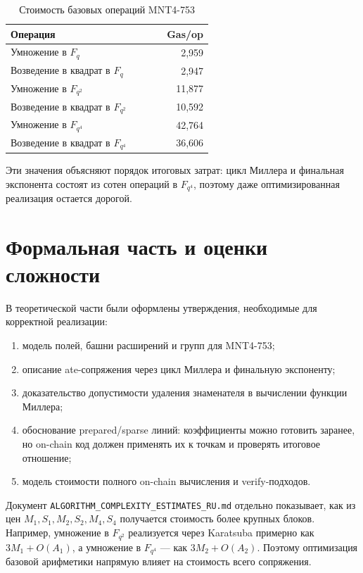 \documentclass[12pt,a4paper]{article}
\newcommand{\code}[1]{\texttt{#1}}
\begin{document}
\begin{table}[h!]
\centering
\caption{Стоимость базовых операций MNT4-753}
\begin{tabular}{p{0.62\linewidth}r}
\toprule
Операция & Gas/op \\
\midrule
Умножение в \(F_q\) & 2,959 \\
Возведение в квадрат в \(F_q\) & 2,947 \\
Умножение в \(F_{q^2}\) & 11,877 \\
Возведение в квадрат в \(F_{q^2}\) & 10,592 \\
Умножение в \(F_{q^4}\) & 42,764 \\
Возведение в квадрат в \(F_{q^4}\) & 36,606 \\
\bottomrule
\end{tabular}
\end{table}

Эти значения объясняют порядок итоговых затрат: цикл Миллера и финальная экспонента состоят из сотен операций в \(F_{q^4}\), поэтому даже оптимизированная реализация остается дорогой.

\section{Формальная часть и оценки сложности}

В теоретической части были оформлены утверждения, необходимые для корректной реализации:

\begin{enumerate}
    \item модель полей, башни расширений и групп для MNT4-753;
    \item описание ate-сопряжения через цикл Миллера и финальную экспоненту;
    \item доказательство допустимости удаления знаменателя в вычислении функции Миллера;
    \item обоснование prepared/sparse линий: коэффициенты можно готовить заранее, но on-chain код должен применять их к точкам и проверять итоговое отношение;
    \item модель стоимости полного on-chain вычисления и verify-подходов.
\end{enumerate}

Документ \code{ALGORITHM\_COMPLEXITY\_ESTIMATES\_RU.md} отдельно показывает, как из цен \(M_1,S_1,M_2,S_2,M_4,S_4\) получается стоимость более крупных блоков. Например, умножение в \(F_{q^2}\) реализуется через Karatsuba примерно как \(3M_1+O(A_1)\), а умножение в \(F_{q^4}\) --- как \(3M_2+O(A_2)\). Поэтому оптимизация базовой арифметики напрямую влияет на стоимость всего сопряжения.
\end{document}
